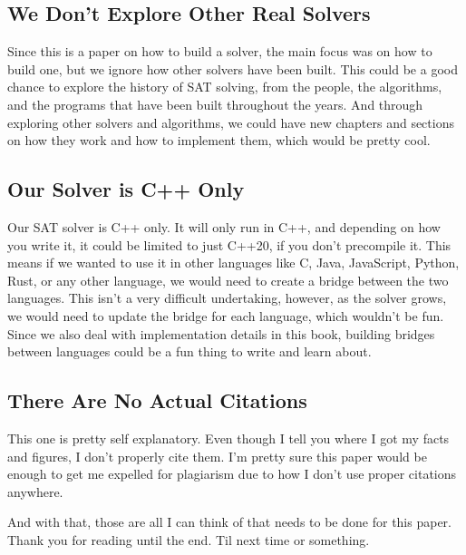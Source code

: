 \documentclass[oneside]{book}
\begin{document}
\subsection{We Don't Explore Other Real Solvers}

Since this is a paper on how to build a solver, the main focus was on how to build one, 
but we ignore how other solvers have been built. This could be a good chance to explore 
the history of SAT solving, from the people, the algorithms, and the programs that have 
been built throughout the years. And through exploring other solvers and algorithms, we 
could have new chapters and sections on how they work and how to implement them, which 
would be pretty cool.

\subsection{Our Solver is C++ Only}

Our SAT solver is C++ only. It will only run in C++, and depending on how you write it, 
it could be limited to just C++20, if you don't precompile it. This means if we wanted 
to use it in other languages like C, Java, JavaScript, Python, Rust, or any other language, 
we would need to create a bridge between the two languages. This isn't a very difficult 
undertaking, however, as the solver grows, we would need to update the bridge for each 
language, which wouldn't be fun. Since we also deal with implementation details in this 
book, building bridges between languages could be a fun thing to write and learn about.

\subsection{There Are No Actual Citations}

This one is pretty self explanatory. Even though I tell you where I got my facts and 
figures, I don't properly cite them. I'm pretty sure this paper would be enough to 
get me expelled for plagiarism due to how I don't use proper citations anywhere. 

And with that, those are all I can think of that needs to be done for this paper. 
Thank you for reading until the end. Til next time or something.
\end{document}
